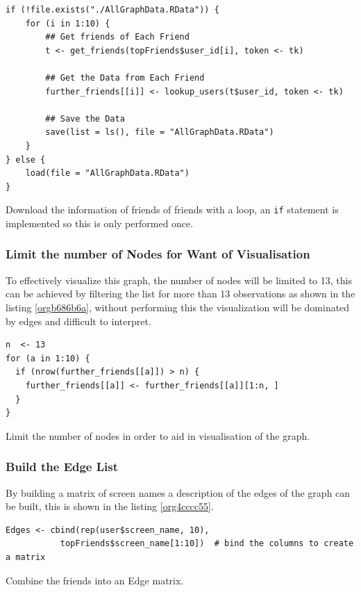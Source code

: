 \documentclass[11pt]{article}
\begin{document}
\begin{listing}[htbp]
\begin{verbatim}
if (!file.exists("./AllGraphData.RData")) {
    for (i in 1:10) {
        ## Get friends of Each Friend
        t <- get_friends(topFriends$user_id[i], token <- tk)

        ## Get the Data from Each Friend
        further_friends[[i]] <- lookup_users(t$user_id, token <- tk)

        ## Save the Data
        save(list = ls(), file = "AllGraphData.RData")
    }
} else {
    load(file = "AllGraphData.RData")
}

\end{verbatim}
\caption{\label{orgef9b0a7}Download the information of friends of friends with a loop, an \texttt{if} statement is implemented so this is only performed once.}
\end{listing}

\subsubsection{Limit the number of Nodes for Want of Visualisation}
\label{sec:org0f68a3f}
To effectively visualize this graph, the number of nodes will be limited to 13, this can be achieved by filtering the list for more than 13 observations as shown in the listing \ref{orgb686b6a}, without performing this the visualization will be dominated by edges and difficult to interpret.

\begin{listing}[htbp]
\begin{verbatim}
n  <- 13
for (a in 1:10) {
  if (nrow(further_friends[[a]]) > n) {
    further_friends[[a]] <- further_friends[[a]][1:n, ]
  }
}
\end{verbatim}
\caption{\label{orgb686b6a}Limit the number of nodes in order to aid in visualisation of the graph.}
\end{listing}

\subsubsection{Build the Edge List}
\label{sec:orgdbc26eb}

By building a matrix of screen names a description of the edges of the graph can be built, this is shown in the listing \ref{org4cccc55}.

\begin{listing}[htbp]
\begin{verbatim}
Edges <- cbind(rep(user$screen_name, 10),
           topFriends$screen_name[1:10])  # bind the columns to create a matrix

\end{verbatim}
\caption{\label{org4cccc55}Combine the friends into an Edge matrix.}
\end{listing}
\end{document}
